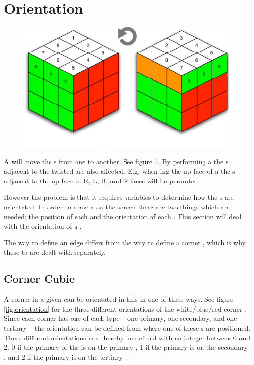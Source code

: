 \section{Orientation}
\label{sec:orientation}

\begin{figure}[h]
	\centering
		\includegraphics[scale=0.5]{input/pics/twistOfUpFace}
	\caption{}
	\label{fig:twistOfUpFace}
\end{figure}

A \face{} will move the \cpiece{}s from one \cubicle{} to another. See figure \ref{fig:twistOfUpFace}. By performing a \twist{} the \face{}s adjacent to the twisted \face{} are also affected. 
E.g. when \twist{}ing the up face of a \rubik{} the \cubie{}s adjacent to the up face in R, L, B, and F faces will be permuted.

However the problem is that it requires variables to determine how the \cubie{}s are orientated. 
In order to draw a \rubik{} on the screen there are two things which are needed; the position of each \cubie{} and the orientation of each \cubie{}. This section will deal with the orientation of a \cubie{}.

The way to define an edge \cubie{} differs from the way to define a corner \cubie{}, which is why these to are dealt with separately.

\subsection{Corner Cubie}
A corner \cubie{} in a given \cubicle{} can be orientated in this \cubicle{} in one of three ways. See figure \ref{fig:orientation} for the three different orientations of the white/blue/red corner \cubie{}.
Since each corner \cubie{} has one of each \facelet{} type -- one primary, one secondary, and one tertiary -- the orientation can be defined from where one of these \facelet{}s are positioned.
These different orientations can thereby be defined with an integer between 0 and 2.
0 if the primary \facelet{} of the \cubie{} is on the primary \face{}, 1 if the primary \facelet{} is on the secondary \face{}, and 2 if the primary \facelet{} is on the tertiary \face{}.

